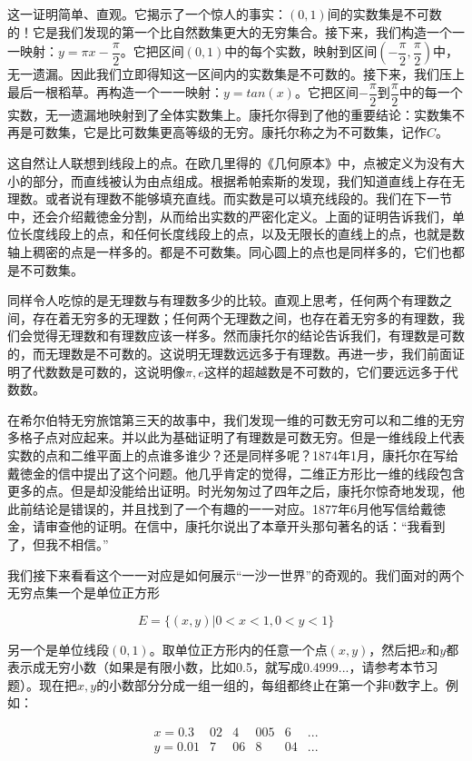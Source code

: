 \documentclass{article}
\begin{document}
这一证明简单、直观。它揭示了一个惊人的事实：$(0, 1)$间的实数集是不可数的！它是我们发现的第一个比自然数集更大的无穷集合。接下来，我们构造一个一一映射：$y = \pi x - \dfrac{\pi}{2}$。它把区间$(0, 1)$中的每个实数，映射到区间$(-\dfrac{\pi}{2}, \dfrac{\pi}{2})$中，无一遗漏。因此我们立即得知这一区间内的实数集是不可数的。接下来，我们压上最后一根稻草。再构造一个一一映射：$ y = tan(x)$。它把区间$-\dfrac{\pi}{2}$到$\dfrac{\pi}{2}$中的每一个实数，无一遗漏地映射到了全体实数集上。康托尔得到了他的重要结论：实数集不再是可数集，它是比可数集更高等级的无穷。康托尔称之为不可数集，记作$C$。

这自然让人联想到线段上的点。在欧几里得的《几何原本》中，点被定义为没有大小的部分，而直线被认为由点组成。根据希帕索斯的发现，我们知道直线上存在无理数。或者说有理数不能够填充直线。而实数是可以填充线段的。我们在下一节中，还会介绍戴徳金分割，从而给出实数的严密化定义。上面的证明告诉我们，单位长度线段上的点，和任何长度线段上的点，以及无限长的直线上的点，也就是数轴上稠密的点是一样多的。都是不可数集。同心圆上的点也是同样多的，它们也都是不可数集。

同样令人吃惊的是无理数与有理数多少的比较。直观上思考，任何两个有理数之间，存在着无穷多的无理数；任何两个无理数之间，也存在着无穷多的有理数，我们会觉得无理数和有理数应该一样多。然而康托尔的结论告诉我们，有理数是可数的，而无理数是不可数的。这说明无理数远远多于有理数。再进一步，我们前面证明了代数数是可数的，这说明像$\pi, e$这样的超越数是不可数的，它们要远远多于代数数。

在希尔伯特无穷旅馆第三天的故事中，我们发现一维的可数无穷可以和二维的无穷多格子点对应起来。并以此为基础证明了有理数是可数无穷。但是一维线段上代表实数的点和二维平面上的点谁多谁少？还是同样多呢？1874年1月，康托尔在写给戴徳金的信中提出了这个问题。他几乎肯定的觉得，二维正方形比一维的线段包含更多的点。但是却没能给出证明。时光匆匆过了四年之后，康托尔惊奇地发现，他此前结论是错误的，并且找到了一个有趣的一一对应。1877年6月他写信给戴徳金，请审查他的证明。在信中，康托尔说出了本章开头那句著名的话：“我看到了，但我不相信。”

我们接下来看看这个一一对应是如何展示“一沙一世界”的奇观的。我们面对的两个无穷点集一个是单位正方形

\[
E = \{ (x, y) | 0 < x < 1, 0 < y < 1\}
\]

另一个是单位线段$(0, 1)$。取单位正方形内的任意一个点$(x, y)$，然后把$x$和$y$都表示成无穷小数（如果是有限小数，比如0.5，就写成0.4999...，请参考本节习题）。现在把$x, y$的小数部分分成一组一组的，每组都终止在第一个非0数字上。例如：

\[
\begin{array}{lcccccc}
x = 0.3 & 02 & 4 & 005 & 6 & ... \\
y = 0.01 & 7 & 06 & 8 & 04 & ... \\
\end{array}
\]
\end{document}
